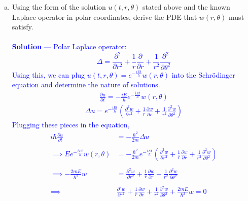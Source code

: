 \documentclass[12pt]{article}
\begin{document}
\begin{enumerate}[(a)]
\item Using the form of the solution $u(t,r,\theta)$ stated above and the known Laplace operator in polar coordinates, derive the PDE that $w(r,\theta)$ must satisfy. \\ \\  \textcolor{blue}{\textbf{Solution} — 
Polar Laplace operator:
$$\Delta = \frac{\partial^2}{\partial r^2} + \frac{1}{r} \frac{\partial }{\partial r} + \frac{1}{r^2} \frac{\partial^2}{\partial \theta ^2}$$
Using this, we can plug $u(t,r,\theta) = e^{-\frac{iEt}{\hbar}} w(r,\theta)$ into the Schr\"{o}dinger equation and determine the nature of solutions. 
\begin{align*}
\frac{\partial u}{\partial t} = -\frac{iE}{\hbar} e^{-\frac{iEt}{\hbar}} w(r,\theta)
\end{align*}
\begin{align*}
\Delta u = e^{-\frac{iEt}{\hbar}}  \left( \frac{\partial^2 w}{\partial r^2} + \frac{1}{r} \frac{\partial w}{\partial r} + \frac{1}{r^2} \frac{\partial^2 w}{\partial \theta ^2} \right)
\end{align*}
Plugging these pieces in the equation,
\begin{align*}
i\hbar \frac{\partial u}{\partial t} &= - \frac{\hbar^2}{2m} \Delta u \\ \\
\implies E e^{-\frac{iEt}{\hbar}} w(r,\theta) &= - \frac{\hbar^2}{2m} e^{-\frac{iEt}{\hbar}}   \left( \frac{\partial^2 w}{\partial r^2} + \frac{1}{r} \frac{\partial w}{\partial r} + \frac{1}{r^2} \frac{\partial^2 w}{\partial \theta ^2} \right) \\ \\
\implies -\frac{2mE}{\hbar^2} w &= \frac{\partial^2 w}{\partial r^2} + \frac{1}{r} \frac{\partial w}{\partial r} + \frac{1}{r^2} \frac{\partial^2 w}{\partial \theta ^2} \\ \\
\implies& \boxed{\frac{\partial^2 w}{\partial r^2} + \frac{1}{r} \frac{\partial w}{\partial r} + \frac{1}{r^2} \frac{\partial^2 w}{\partial \theta ^2} + \frac{2mE}{\hbar^2} w = 0} \\
\end{align*}
}


\end{enumerate}
\end{document}
